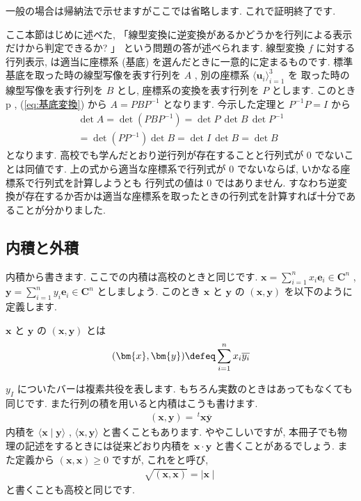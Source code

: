 \documentclass[openany, a4paper, oneside]{jsbook}
\begin{document}
一般の場合は帰納法で示せますがここでは省略します.
これで証明終了です.

ここ本節はじめに述べた, 「線型変換に逆変換があるかどうかを行列による表示だけから判定できるか? 」
という問題の答が述べられます.
線型変換 $f$ に対する行列表示, は適当に座標系 (基底) を選んだときに一意的に定まるものです.
標準基底を取った時の線型写像を表す行列を $A$ , 別の座標系 $\langle \bm{u}_i \rangle _{i=1}^3$ を
取った時の線型写像を表す行列を $B$ とし,
座標系の変換を表す行列を $P$ とします.
このとき p \pageref{eq:基底変換}, (\ref{eq:基底変換}) から $A = P B P^{-1}$ となります.
今示した定理と $P^{-1} P = I$ から
\begin{gather}
    \det A
    =
    \det ( P B P^{-1} )
    =
    \det P \, \det B \, \det P^{-1} \\
    =
    \det ( P P^{-1} ) \det B
    =
    \det I \, \det B
    =
    \det B
\end{gather}
となります.
高校でも学んだとおり逆行列が存在することと行列式が $0$ でないことは同値です.
上の式から適当な座標系で行列式が $0$ でないならば, いかなる座標系で行列式を計算しようとも
行列式の値は $0$ ではありません.
すなわち逆変換が存在するか否かは適当な座標系を取ったときの行列式を計算すれば十分であることが分かりました.
\subsection{内積と外積}

内積から書きます.
ここでの内積は高校のときと同じです.
$\bm{x}= \sum_{i=1}^n x_{i}\bm{e}_{i} \in \bm{C}^n$  , $\bm{y} = \sum_{i=1}^n y_{i}\bm{e}_{i} \in \bm{C}^n$ としましょう.
このとき $\bm{x}$ と $\bm{y}$ の $(\bm{x}, \bm{y})$ を以下のように定義します.
\begin{defn} $\bm{x}$ と $\bm{y}$ の $(\bm{x}, \bm{y})$ とは
\begin{align}
(\bm{x}, \bm{y} ) \defeq \sum_{i=1}^n x_{i} \overline {y_{i}}
\end{align}
\end{defn}
$y_{I}$ についたバーは複素共役を表します.
もちろん実数のときはあってもなくても同じです.
また行列の積を用いると内積はこうも書けます.
\begin{align}
    (\bm{x},\bm{y}) = \, ^{t}\bm{x} \overline{\bm{y}}
\end{align}
内積を $\langle \bm{x} \mid \bm{y} \rangle$ ,  $\langle \bm{x},\bm{y} \rangle$ と書くこともあります.
ややこしいですが, 本冊子でも物理の記述をするときには従来どおり内積を $\bm{x} \cdot \bm{y}$ と書くことがあるでしょう.
また定義から $(\bm{x},\bm{x})\geq 0$ ですが, これをと呼び,
\begin{align}
    \sqrt{(\bm{x},\bm{x})}=\mid \bm{x} \mid
\end{align}
と書くことも高校と同じです.
\end{document}
